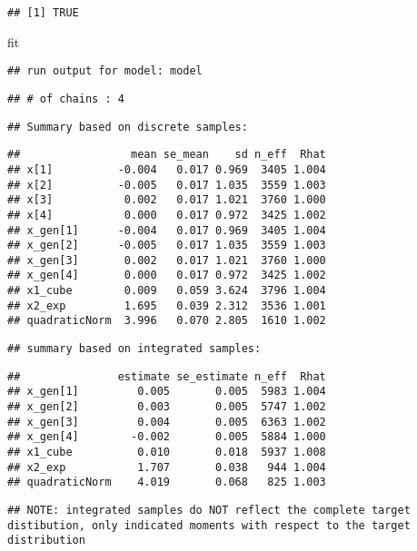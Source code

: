 \documentclass[
]{book}
\newenvironment{Shaded}{\begin{snugshade}}{\end{snugshade}}
\newcommand{\NormalTok}[1]{#1}
\begin{document}
\begin{verbatim}
## [1] TRUE
\end{verbatim}

\begin{Shaded}
\begin{Highlighting}[]
\NormalTok{fit}
\end{Highlighting}
\end{Shaded}

\begin{verbatim}
## run output for model: model
\end{verbatim}

\begin{verbatim}
## # of chains : 4
\end{verbatim}

\begin{verbatim}
## Summary based on discrete samples:
\end{verbatim}

\begin{verbatim}
##                 mean se_mean    sd n_eff  Rhat
## x[1]          -0.004   0.017 0.969  3405 1.004
## x[2]          -0.005   0.017 1.035  3559 1.003
## x[3]           0.002   0.017 1.021  3760 1.000
## x[4]           0.000   0.017 0.972  3425 1.002
## x_gen[1]      -0.004   0.017 0.969  3405 1.004
## x_gen[2]      -0.005   0.017 1.035  3559 1.003
## x_gen[3]       0.002   0.017 1.021  3760 1.000
## x_gen[4]       0.000   0.017 0.972  3425 1.002
## x1_cube        0.009   0.059 3.624  3796 1.004
## x2_exp         1.695   0.039 2.312  3536 1.001
## quadraticNorm  3.996   0.070 2.805  1610 1.002
\end{verbatim}

\begin{verbatim}
## summary based on integrated samples:
\end{verbatim}

\begin{verbatim}
##               estimate se_estimate n_eff  Rhat
## x_gen[1]         0.005       0.005  5983 1.004
## x_gen[2]         0.003       0.005  5747 1.002
## x_gen[3]         0.004       0.005  6363 1.002
## x_gen[4]        -0.002       0.005  5884 1.000
## x1_cube          0.010       0.018  5937 1.008
## x2_exp           1.707       0.038   944 1.004
## quadraticNorm    4.019       0.068   825 1.003
\end{verbatim}

\begin{verbatim}
## NOTE: integrated samples do NOT reflect the complete target distibution, only indicated moments with respect to the target distribution
\end{verbatim}
\end{document}
